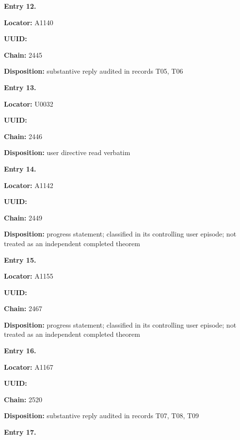 
\textbf{Entry 12.}

\textbf{Locator:} A1140

\textbf{UUID:} \protect{}

\textbf{Chain:} 2445

\textbf{Disposition:} substantive reply audited in records T05, T06


\textbf{Entry 13.}

\textbf{Locator:} U0032

\textbf{UUID:} \protect{}

\textbf{Chain:} 2446

\textbf{Disposition:} user directive read verbatim


\textbf{Entry 14.}

\textbf{Locator:} A1142

\textbf{UUID:} \protect{}

\textbf{Chain:} 2449

\textbf{Disposition:} progress statement; classified in its controlling
user episode; not treated as an independent completed theorem


\textbf{Entry 15.}

\textbf{Locator:} A1155

\textbf{UUID:} \protect{}

\textbf{Chain:} 2467

\textbf{Disposition:} progress statement; classified in its controlling
user episode; not treated as an independent completed theorem


\textbf{Entry 16.}

\textbf{Locator:} A1167

\textbf{UUID:} \protect{}

\textbf{Chain:} 2520

\textbf{Disposition:} substantive reply audited in records T07, T08, T09


\textbf{Entry 17.}

